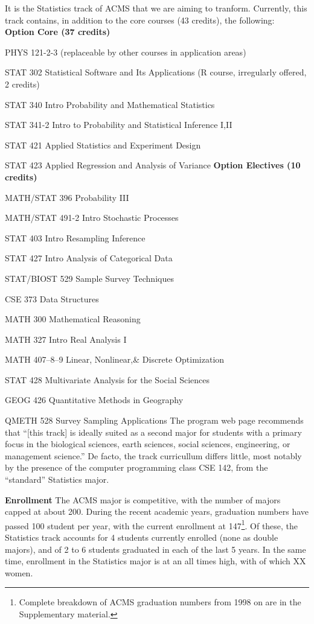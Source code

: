 It is the Statistics track of ACMS that we are aiming to
tranform. Currently, this track contains, in addition to the core
courses (43 credits), the following:
\\
{\bf Option Core (37 credits)}
\bits
    \item {\sc PHYS 121-2-3} (replaceable by other courses in application areas)
    \item {\sc STAT 302} Statistical Software and Its Applications (R course, irregularly offered, 2 credits)
    \item {\sc STAT 340} Intro Probability and Mathematical Statistics
    \item {\sc STAT 341-2} Intro to Probability and Statistical Inference I,II
    \item {\sc STAT 421} Applied Statistics and Experiment Design
    \item {\sc STAT 423} Applied Regression and Analysis of Variance
\eits
{\bf Option Electives (10 credits)}
\bits
    \item {\sc MATH/STAT 396} Probability III
    \item {\sc MATH/STAT 491-2} Intro Stochastic Processes
    \item {\sc STAT 403} Intro Resampling Inference
    \item {\sc STAT 427} Intro Analysis of Categorical Data
    \item {\sc STAT/BIOST 529} Sample Survey Techniques
    \item {\sc CSE 373} Data Structures
    \item {\sc MATH 300} Mathematical Reasoning
    \item {\sc MATH 327} Intro Real Analysis I
    \item {\sc MATH 407--8--9} Linear, Nonlinear,\& Discrete Optimization
    \item {\sc STAT 428} Multivariate Analysis for the Social Sciences
    \item {\sc GEOG 426} Quantitative Methods in Geography
    \item {\sc QMETH 528} Survey Sampling Applications
\eits
The program web page recommends that ``[this track] is ideally suited as a second major for students with a primary focus in the biological sciences, earth sciences, social sciences, engineering, or management science.''
De facto, the track curricullum differs little, most notably by the
presence of the computer programming class {\sc CSE 142}, from the
``standard'' Statistics major.

{\bf Enrollment} The ACMS major is competitive, with the number of
majors capped at about 200.  During the recent academic years,
graduation numbers have passed 100 student per year, with the current
enrollment at 147\footnote{Complete breakdown of ACMS graduation
  numbers from 1998 on are in the Supplementary material.}.  Of these,
the Statistics track accounts for 4 students currently enrolled (none
as double majors), and of 2 to 6 students graduated in each of the
last 5 years. In the same time, enrollment in the Statistics major is
at an all times high, with  of which XX women.

